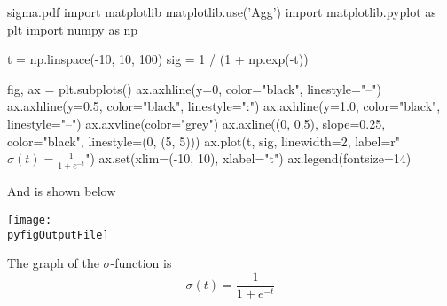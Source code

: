 \documentclass[
  layout={slide, aspect=16|9},
]{ztex}
\begin{document}
\lipsum[2][1-4]
\begin{pyfig}{sigma.pdf}
import matplotlib
matplotlib.use('Agg')
import matplotlib.pyplot as plt
import numpy as np

t = np.linspace(-10, 10, 100)
sig = 1 / (1 + np.exp(-t))

fig, ax = plt.subplots()
ax.axhline(y=0, color="black", linestyle="--")
ax.axhline(y=0.5, color="black", linestyle=":")
ax.axhline(y=1.0, color="black", linestyle="--")
ax.axvline(color="grey")
ax.axline((0, 0.5), slope=0.25, color="black", linestyle=(0, (5, 5)))
ax.plot(t, sig, linewidth=2, label=r"$\sigma(t) = \frac{1}{1 + e^{-t}}$")
ax.set(xlim=(-10, 10), xlabel="t")
ax.legend(fontsize=14)
\end{pyfig}

And is shown below
\begin{center}
\texttt{[image: \\pyfigOutputFile]}
\end{center}

The graph of the $\sigma$-function is 
\[
\sigma(t) = \frac{1}{1 + e^{-t}}
\]
\end{document}
